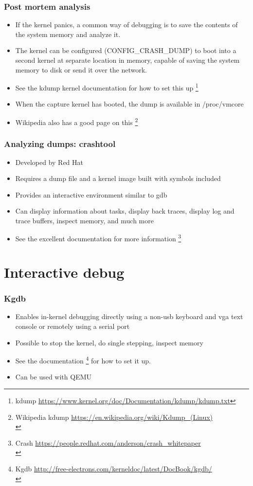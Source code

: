 \documentclass{beamer}
\begin{document}
\begin{frame}[fragile]
\frametitle{Post mortem analysis}
\begin{itemize}
\item If the kernel panics, a common way of debugging is to save the contents of the system memory and analyze it.
\item The kernel can be configured (CONFIG\_CRASH\_DUMP) to boot into a second kernel at separate location in memory, capable of saving the system memory to disk or send it over the network.
\item See the kdump kernel documentation for how to set this up \footnote{kdump \url{https://www.kernel.org/doc/Documentation/kdump/kdump.txt}}
\item When the capture kernel has booted, the dump is available in /proc/vmcore 
\item Wikipedia also has a good page on this \footnote{Wikipedia kdump \url{https://en.wikipedia.org/wiki/Kdump_(Linux)} \\}
\end{itemize}
\end{frame}

\begin{frame}
\frametitle{Analyzing dumps: crashtool}
\begin{itemize}
	\item Developed by Red Hat
	\item Requires a dump file and a kernel image built with symbols included
	\item Provides an interactive environment similar to gdb
	\item Can display information about tasks, display back traces, display log and trace buffers, inspect memory, and much more
	\item See the excellent documentation for more information \footnote{Crash \url{https://people.redhat.com/anderson/crash_whitepaper} \\}
\end{itemize}
\end{frame}

\section{Interactive debug}
\begin{frame}
\frametitle{Kgdb}
\begin{itemize}
	\item Enables in-kernel debugging directly using a non-usb keyboard and vga text console or remotely using a serial port
	\item Possible to stop the kernel, do single stepping, inspect memory
	\item See the documentation \footnote{Kgdb \url{http://free-electrons.com/kerneldoc/latest/DocBook/kgdb/} \\} for how to set it up.
	\item Can be used with QEMU
\end{itemize}
\end{frame}
\end{document}
